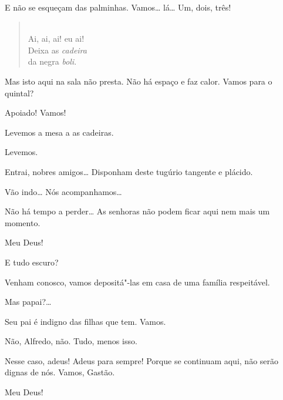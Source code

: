  E não se esqueçam das palminhas. Vamos\ldots{} 
lá\ldots{} Um, dois, três!  

\begin{verse}
 \\
Ai, ai, ai! eu ai!\\
Deixa as \textit{cadeira}\\
da negra \textit{boli}.
\end{verse}


 Mas isto aqui na sala não presta. Não há espaço e faz calor.
Vamos para o quintal?

 Apoiado! Vamos!

 Levemos a mesa a as cadeiras.

 Levemos. 

 Entrai, nobres amigos\ldots{} Disponham deste tugúrio tangente
e plácido.

 Vão indo\ldots{} Nós acompanhamos\ldots{} 

{}



 Não há tempo a perder\ldots{} As senhoras não podem ficar aqui nem
mais um momento.

 Meu Deus!

 E tudo escuro?

 Venham conosco, vamos depositá"-las em casa de uma família
respeitável.

 Mas papai?\ldots

 Seu pai é indigno das filhas que tem. Vamos.

 Não, Alfredo, não. Tudo, menos isso.

 Nesse caso, adeus! Adeus para sempre! Porque se continuam
aqui, não serão dignas de nós. Vamos, Gastão.

 Meu Deus!  

